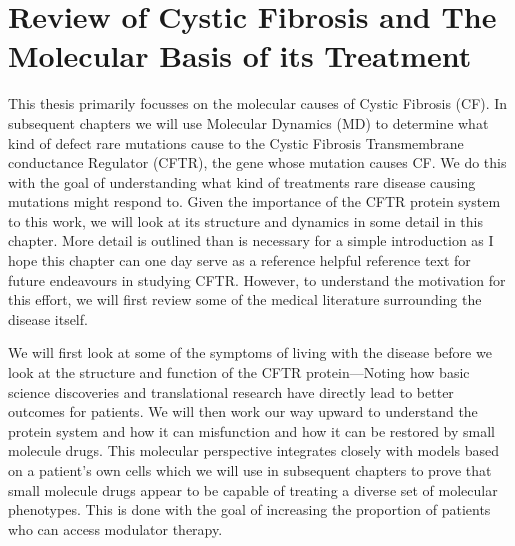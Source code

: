 \chapter{Review of Cystic Fibrosis and The Molecular Basis of its Treatment}
\label{chap:cftr}
\newpage





This thesis primarily focusses on the molecular causes of Cystic Fibrosis (CF). In subsequent chapters we will use Molecular Dynamics (MD) to determine what kind of defect rare mutations cause to the Cystic Fibrosis Transmembrane conductance Regulator (CFTR), the gene whose mutation causes CF. We do this with the goal of understanding what kind of treatments rare disease causing mutations might respond to. Given the importance of the CFTR protein system to this work, we will look at its structure and dynamics in some detail in this chapter. More detail is outlined than is necessary for a simple introduction as I hope this chapter can one day serve as a reference helpful reference text for future endeavours in studying CFTR. However, to understand the motivation for this effort, we will first review some of the medical literature surrounding the disease itself. 

We will first look at some of the symptoms of living with the disease before we look at the structure and function of the CFTR protein---Noting how basic science discoveries and translational research have directly lead to better outcomes for patients. We will then work our way upward to understand the protein system and how it can misfunction and how it can be restored by small molecule drugs. This molecular perspective integrates closely with models based on a patient's own cells which we will use in subsequent chapters to prove that small molecule drugs appear to be capable of treating a diverse set of molecular phenotypes. This is done with the goal of increasing the proportion of patients who can access modulator therapy. 

